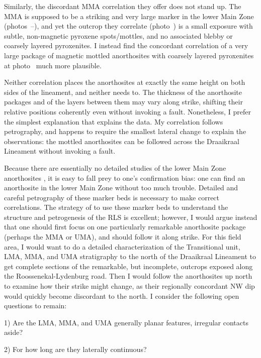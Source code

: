 Similarly, the discordant MMA correlation they offer does not stand up.
The MMA is supposed to be a striking and very large marker in the lower
Main Zone (photos~--), and yet the outcrop they correlate (photo~) is a small exposure with subtle, non-magnetic pyroxene
spots/mottles, and no associated blebby or coarsely layered pyroxenites.
I instead find the concordant correlation of a very large package of
magnetic mottled anorthosites with coarsely layered pyroxenites at photo~ much more plausible.

Neither correlation places the anorthosites at exactly the same height on
both sides of the lineament, and neither needs to. The thickness of the
anorthosite packages and of the layers between them may vary along strike,
shifting their relative positions coherently even without invoking a fault.
Nonetheless, I prefer the simplest explanation that explains the data. My
correlation follows petrography, and happens to require the smallest lateral
change to explain the observations: the mottled anorthosites can be followed
across the Draaikraal Lineament without invoking a fault.

Because there are essentially no detailed studies of the lower Main Zone
anorthosites \citep[similar to][for the GMA of the
transitional unit]{mitchell2002}, it is easy to fall prey to one's confirmation bias:
one can find an anorthosite in the lower Main Zone without too much
trouble. Detailed and careful petrography of these marker beds is
necessary to make correct correlations. The strategy of
\citet{latypovetal2022} to use these marker beds to understand the structure and
petrogenesis of the RLS is excellent; however, I would argue instead
that one should first focus on one particularly remarkable anorthosite
package (perhaps the MMA or UMA), and should follow it along strike. For
this field area, I would want to do a detailed characterization of the
Transitional unit, LMA, MMA, and UMA stratigraphy to the north of the
Draaikraal Lineament to get complete sections of the remarkable, but
incomplete, outcrops exposed along the Roossenekal-Lydenburg road. Then
I would follow the anorthosites up north to examine how their strike
might change, as their regionally concordant NW dip would quickly become
discordant to the north. I consider the following open questions to
remain:

1) Are the LMA, MMA, and UMA generally planar features, irregular
contacts aside?

2) For how long are they laterally continuous?

